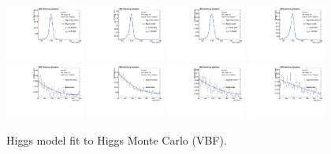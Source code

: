 \begin{figure}[h]
  \centering
\includegraphics[width=0.23\textwidth]{figures/sec-signals/HiggsShapes/vbf_HM_signal_fit_mgg_cat0.pdf}
\includegraphics[width=0.23\textwidth]{figures/sec-signals/HiggsShapes/vbf_HM_signal_fit_mgg_cat1.pdf}
\includegraphics[width=0.23\textwidth]{figures/sec-signals/HiggsShapes/vbf_LM_signal_fit_mgg_cat0.pdf}
\includegraphics[width=0.23\textwidth]{figures/sec-signals/HiggsShapes/vbf_LM_signal_fit_mgg_cat1.pdf}
\includegraphics[width=0.23\textwidth]{figures/sec-signals/HiggsShapes/vbf_HM_signal_fit_mjj_cat0.pdf}
\includegraphics[width=0.23\textwidth]{figures/sec-signals/HiggsShapes/vbf_HM_signal_fit_mjj_cat1.pdf}
\includegraphics[width=0.23\textwidth]{figures/sec-signals/HiggsShapes/vbf_LM_signal_fit_mjj_cat0.pdf}
\includegraphics[width=0.23\textwidth]{figures/sec-signals/HiggsShapes/vbf_LM_signal_fit_mjj_cat1.pdf}
  \caption{Higgs model fit to Higgs Monte Carlo (VBF).}
  \label{fig:higgs_fit_vbf}
\end{figure}

